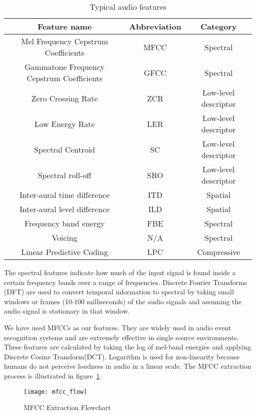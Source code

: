 \begin{table}[tb]
\caption[Typical audio features]{Typical audio features}
\label{tab:audio_feats}
\centering
\begin{tabular}{ccc}
\toprule
Feature name	& Abbreviation & Category \\
\midrule
Mel Frequency Cepstrum Coefficients	& MFCC & Spectral\\
Gammatone Frequency Cepstrum Coefficients	& GFCC & Spectral \\
Zero Crossing Rate	& ZCR & Low-level descriptor \\
Low Energy Rate	& LER & Low-level descriptor \\
Spectral Centroid	& SC & Low-level descriptor \\
Spectral roll-off	& SRO & Low-level descriptor \\
Inter-aural time difference 	& ITD & Spatial \\
Inter-aural level difference & ILD & Spatial \\
Frequency band energy	& FBE & Spectral \\
Voicing	& N/A & Spectral \\
Linear Predictive Coding	& LPC & Compressive \\
\bottomrule 
\end{tabular}
\end{table}

The spectral features indicate how much of the input signal is found inside a certain frequency bands over a range of frequencies. Discrete Fourier Transforms (DFT) are used to convert temporal information to spectral by taking small windows or frames (10-100 milliseconds) of the audio signals and assuming the audio signal is stationary in that window. 

We have used MFCCs as our features. They are widely used in audio event recognition systems and are extremely effective in single source environments. These features are calculated by taking the log of mel-band energies and applying Discrete Cosine Transform(DCT). Logarithm is used for non-linearity because humans do not perceive loudness in audio in a linear scale. The MFCC extraction process is illustrated in figure~\ref{fig:mfcc_flow}.

\begin{figure}[!htb] 
\centering 
\texttt{[image: mfcc\_flow]}
\caption[MFCC Extraction Flowchart]{MFCC Extraction Flowchart}
\label{fig:mfcc_flow} 
\end{figure}

